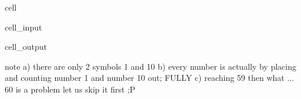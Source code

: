 \documentclass[letterpaper,10pt,english]{jupyterBook}
\begin{document}
\begin{sphinxuseclass}{cell}\begin{sphinxVerbatimInput}

\begin{sphinxuseclass}{cell_input}
\begin{sphinxVerbatim}[commandchars=\\\{\}]
\end{sphinxVerbatim}

\end{sphinxuseclass}\end{sphinxVerbatimInput}
\begin{sphinxVerbatimOutput}

\begin{sphinxuseclass}{cell_output}
\noindent{}

\end{sphinxuseclass}\end{sphinxVerbatimOutput}

\end{sphinxuseclass}
\begin{sphinxVerbatim}[commandchars=\\\{\}]
        note 
        a) there are only 2 symbols 1 and 10
        b) every number is actually by placing and counting number 1 and number 10 out; FULLY
        c) reaching 59 then what ... 60 is a problem let us skip it first ;\PYGZhy{}P
\end{sphinxVerbatim}
\end{document}
